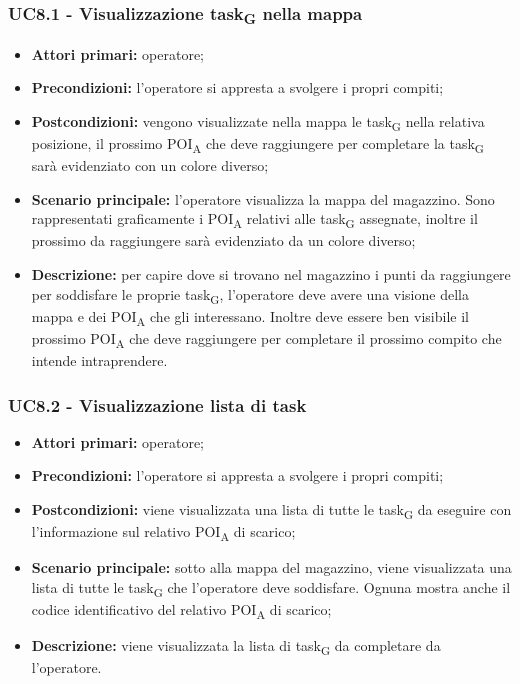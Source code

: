 \subsubsection{UC8.1 - Visualizzazione task\textsubscript{G} nella mappa}
\begin{itemize}
	\item 	\textbf{Attori primari:} operatore;
	\item 	\textbf{Precondizioni:} l'operatore si appresta a svolgere i propri compiti;
	\item 	\textbf{Postcondizioni:} vengono visualizzate nella mappa le task\textsubscript{G} nella relativa posizione, il prossimo POI\textsubscript{A} che deve raggiungere per completare la task\textsubscript{G} sarà evidenziato con un colore diverso;
	\item 	\textbf{Scenario principale:} l'operatore visualizza la mappa del magazzino. Sono rappresentati graficamente i POI\textsubscript{A} relativi alle task\textsubscript{G} assegnate, inoltre il prossimo da raggiungere sarà evidenziato da un colore diverso;
	\item 	\textbf{Descrizione:} per capire dove si trovano nel magazzino i punti da raggiungere per soddisfare le proprie task\textsubscript{G}, l'operatore deve avere una visione della mappa e dei POI\textsubscript{A} che gli interessano. Inoltre deve essere ben visibile il prossimo POI\textsubscript{A} che deve raggiungere per completare il prossimo compito che intende intraprendere.
\end{itemize}



\subsubsection{UC8.2 - Visualizzazione lista di task}
\begin{itemize}
	\item 	\textbf{Attori primari:} operatore;
	\item 	\textbf{Precondizioni:} l'operatore si appresta a svolgere i propri compiti;
	\item 	\textbf{Postcondizioni:} viene visualizzata una lista di tutte le task\textsubscript{G} da eseguire con l'informazione sul relativo POI\textsubscript{A} di scarico;
	\item 	\textbf{Scenario principale:} sotto alla mappa del magazzino, viene visualizzata una lista di tutte le task\textsubscript{G} che l'operatore deve soddisfare. Ognuna mostra anche il codice identificativo del relativo POI\textsubscript{A} di scarico;
	\item 	\textbf{Descrizione:} viene visualizzata la lista di task\textsubscript{G} da completare da l'operatore.
\end{itemize}

